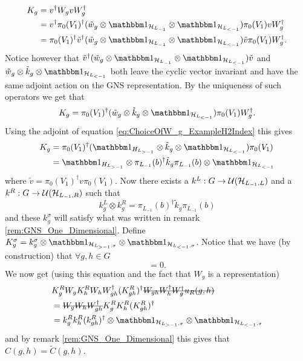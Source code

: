 \documentclass[12pt,a4paper,twoside]{article}
\numberwithin{equation}{section}
\begin{document}
\begin{align}
	K_g&=v^\dagger W_g v W_g^\dagger\\
	&=v^\dagger \pi_{0}(V_1)^{\dagger}(\tilde{w}_g\otimes\id_{\HH_{L_{-1}}}\otimes\id_{\HH_{L_{<-1}}}) \pi_{0}(V_1) v W_g^\dagger\\
	&=\pi_{0}(V_1)^{\dagger}\tilde v^\dagger(\tilde{w}_g\otimes\id_{\HH_{L_{-1}}}\otimes\id_{\HH_{L_{<-1}}}) \tilde v \pi_{0}(V_1) W_g^\dagger.
\end{align}
Notice however that $\tilde v^\dagger(\tilde{w}_g\otimes\id_{\HH_{L_{-1}}}\otimes\id_{\HH_{L_{<-1}}}) \tilde v$ and $\tilde{w}_g\otimes\tilde{k}_g\otimes\id_{\HH_{L_{<-1}}}$ both leave the cyclic vector invariant and have the same adjoint action on the GNS representation. By the uniqueness of such operators we get that
\begin{equation}
	K_g=\pi_{0}(V_1)^{\dagger}(\tilde{w}_g\otimes\tilde{k}_g\otimes\id_{\HH_{L_{<-1}}}) \pi_{0}(V_1) W_g^\dagger.
\end{equation}
Using the adjoint of equation \eqref{eq:ChoiceOfW_g_ExampleH2Index} this gives
\begin{align}
	K_g&=\pi_{0}(V_1)^{\dagger}(\id_{H_{L_{>-1}}}\otimes \tilde k_g \otimes\id_{\HH_{L_{<-1}}}) \pi_{0}(V_1)\\
	&=\id_{H_{L_{>-1}}}\otimes \pi_{L_{-1}}(b)^\dagger \tilde k_g \pi_{L_{-1}}(b) \otimes\id_{\HH_{L_{<-1}}}
\end{align}
where $\tilde{v}=\pi_0(V_1)^\dagger v\pi_0(V_1)$. Now there exists a $k^L:G\rightarrow \mathcal U(\mathcal H_{L_{-1},L})$ and a $k^R:G\rightarrow \mathcal U(\mathcal H_{L_{-1},R})$ such that
\begin{equation}
	k^L_g\otimes k^R_g=\pi_{L_{-1}}(b)^\dagger \tilde k_g \pi_{L_{-1}}(b)
\end{equation}
and these $k^\sigma_g$ will satisfy what was written in remark \ref{rem:GNS_One_Dimensional}. Define $K^\sigma_g=k^\sigma_g\otimes\id_{\HH_{L_{>-1},\sigma}}\otimes\id_{\HH_{L_{<-1},\sigma}}$. Notice that we have (by construction) that $\forall g,h\in G$
\begin{equation}
	[K^\sigma_g\otimes\id_{\HH_{\ZZ^2/\sigma}},W_h]=0.
\end{equation}
We now get (using this equation and the fact that $W_g$ is a representation)
\begin{align}
	&K_g^R W_g K_h^R W_h W_{gh}^\dagger (K_{gh}^R)^\dagger \stkout{W_{gh}W_h^\dagger W_g^\dagger u_R(g,h)}\\
	&=\stkout{W_g W_h W_{gh}^\dagger} K_g^R K_h^R (K_{gh}^R)^\dagger\\
	&=k_g^R k_h^R (k_{gh}^R)^\dagger\otimes \id_{\HH_{L_{>-1},\sigma}}\otimes\id_{\HH_{L_{<-1},\sigma}}
\end{align}
and by remark \ref{rem:GNS_One_Dimensional} this gives that $C(g,h)=\tilde{C}(g,h)$.
\end{document}
